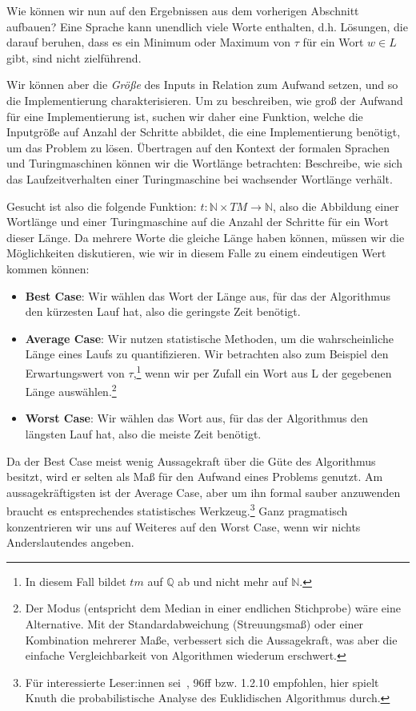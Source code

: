 Wie können wir nun auf den Ergebnissen aus dem vorherigen Abschnitt aufbauen?
Eine Sprache kann unendlich viele Worte enthalten,
d.h. Lösungen, die darauf beruhen,
dass es ein Minimum oder Maximum von $\tau$ für ein Wort $w \in L$ gibt,
sind nicht zielführend.

Wir können aber die \emph{Größe} des Inputs in Relation zum Aufwand setzen,
und so die Implementierung charakterisieren.
Um zu beschreiben,
wie groß der Aufwand für eine Implementierung ist,
suchen wir daher eine Funktion,
welche die Inputgröße auf Anzahl der Schritte abbildet,
die eine Implementierung benötigt,
um das Problem zu lösen.
Übertragen auf den Kontext der formalen Sprachen und Turingmaschinen
können wir die Wortlänge betrachten:
Beschreibe, wie sich das Laufzeitverhalten einer Turingmaschine
bei wachsender Wortlänge verhält.

Gesucht ist also die folgende Funktion:
$t: \mathbb{N} \times TM \rightarrow \mathbb{N}$,
also die Abbildung einer Wortlänge und einer Turingmaschine
auf die Anzahl der Schritte für ein Wort dieser Länge.
Da mehrere Worte die gleiche Länge haben können,
müssen wir die Möglichkeiten diskutieren,
wie wir in diesem Falle zu einem eindeutigen Wert kommen können:
\begin{itemize}
    \item \textbf{Best Case}: Wir wählen das Wort der Länge aus,
        für das der Algorithmus den kürzesten Lauf hat,
        also die geringste Zeit benötigt.
    \item \textbf{Average Case}: Wir nutzen statistische Methoden,
        um die wahrscheinliche Länge eines Laufs zu quantifizieren.
        Wir betrachten also zum Beispiel den Erwartungswert von $\tau$,\footnote{%
            In diesem Fall bildet $tm$ auf $\mathbb{Q}$ ab und nicht mehr auf $\mathbb{N}$.}
        wenn wir per Zufall ein Wort aus L der gegebenen Länge auswählen.\footnote{%
            Der Modus (entspricht dem Median in einer endlichen Stichprobe) wäre eine Alternative.
        Mit der Standardabweichung (Streuungsmaß) oder einer Kombination mehrerer Maße,
        verbessert sich die Aussagekraft,
        was aber die einfache Vergleichbarkeit von Algorithmen wiederum erschwert.}

    \item \textbf{Worst Case}: Wir wählen das Wort aus,
        für das der Algorithmus den längsten Lauf hat,
        also die meiste Zeit benötigt.
\end{itemize}

Da der Best Case meist wenig Aussagekraft über die Güte des Algorithmus besitzt,
wird er selten als Maß für den Aufwand eines Problems genutzt.
Am aussagekräftigsten ist der Average Case,
aber um ihn formal sauber anzuwenden braucht es
entsprechendes statistisches Werkzeug.\footnote{%
    Für interessierte Leser:innen sei~\cite{knuth1}, 96ff bzw. 1.2.10 empfohlen,
    hier spielt Knuth die probabilistische Analyse des Euklidischen Algorithmus durch.}
Ganz pragmatisch konzentrieren wir uns auf Weiteres auf den Worst Case,
wenn wir nichts Anderslautendes angeben.



